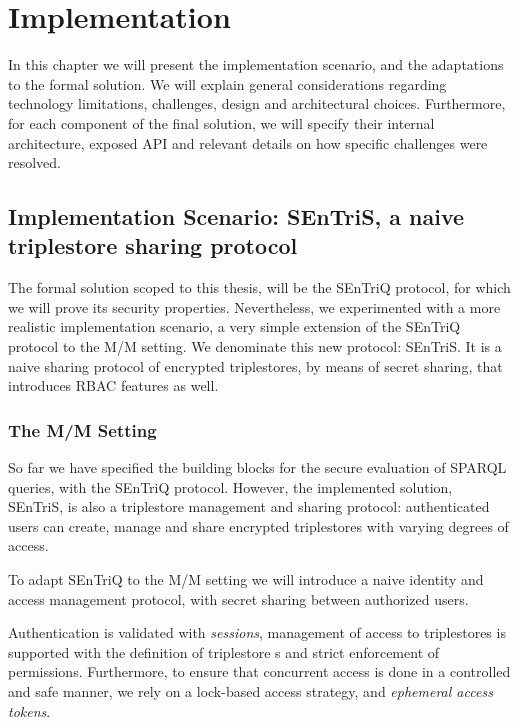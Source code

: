 
\chapter{Implementation}
\label{cha:implementation}


In this chapter we will present the implementation scenario, and the adaptations to the formal solution. We will explain general considerations regarding technology limitations, challenges, design and architectural choices. Furthermore, for each component of the final solution, we will specify their internal architecture, exposed API and relevant details on how specific challenges were resolved.

\section{Implementation Scenario: SEnTriS, a naive triplestore sharing protocol}

The formal solution scoped to this thesis, will be the \gls{SEnTriQ} protocol, for which we will prove its security properties. Nevertheless, we experimented with a more realistic implementation scenario, a very simple extension of the \gls{SEnTriQ} protocol to the \gls{M/M} setting. We denominate this new protocol: \gls{SEnTriS}. It is a naive sharing protocol of encrypted triplestores, by means of secret sharing, that introduces \gls{RBAC} features as well.

\subsection{The M/M Setting}
\label{ch4:sec:implementation:mm-setting}

So far we have specified the building blocks for the secure evaluation of \gls{SPARQL} queries, with the \gls{SEnTriQ} protocol. However, the implemented solution, \gls{SEnTriS}, is also a triplestore management and sharing protocol: authenticated users can create, manage and share encrypted triplestores with varying degrees of access.

To adapt \gls{SEnTriQ} to the \gls{M/M} setting we will introduce a naive identity and access management protocol, with secret sharing between authorized users.

Authentication is validated with \emph{sessions}, management of access to triplestores is supported with the definition of triplestore s and strict enforcement of permissions.
Furthermore, to ensure that concurrent access is done in a controlled and safe manner, we rely on a lock-based access strategy, and \emph{ephemeral access tokens}.

